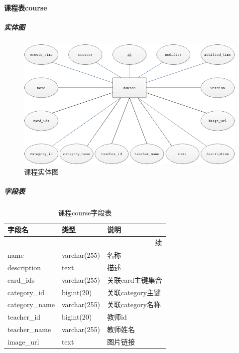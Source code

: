 \documentclass[titlepage,UTF8,linespread=1.5]{ctexart}
\begin{document}
\paragraph{课程表course}
\subparagraph{实体图}
\begin{figure}[H]
    \centering
    \includegraphics[width=140mm]{entity-course.png}
    \caption{课程实体图}
    \label{fig:entity-course}
\end{figure}
\subparagraph{字段表}
\begin{longtable}{|p{10em}|p{6em}|p{15em}|}
    \caption{课程course字段表}\label{tab:table_course}   \\\hline
    字段名         & 类型         & 说明                 \\\hline
    \endfirsthead
    \multicolumn{3}{r}{{续\tablename\thetable{}}}        \\\hline
    \endhead
    name           & varchar(255) & 名称                 \\\hline
    description    & text         & 描述                 \\\hline
    card\_ids      & varchar(255) & 关联card主键集合     \\\hline
    category\_id   & bigint(20)   & 关联category主键     \\\hline
    category\_name & varchar(255) & 关联category名称     \\\hline
    teacher\_id    & bigint(20)   & 教师id               \\\hline
    teacher\_name  & varchar(255) & 教师姓名             \\\hline
    image\_url     & text         & 图片链接             \\\hline
\end{longtable}\par
\end{document}
